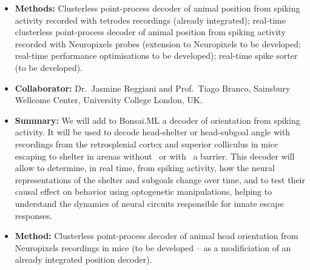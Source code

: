 \begin{itemize}
    \item\textbf{Methods:} Clusterless point-process decoder of animal position
        from spiking activity recorded with tetrodes recordings (already
        integrated); real-time clusterless point-process decoder of animal
        position from spiking activity recorded with Neuropixels probes
        (extension to Neuropixels to be developed; real-time performance
        optimisations to be developed); real-time spike sorter (to be
        developed).

\end{itemize}


\begin{itemize}

    \item\textbf{Collaborator:} Dr.~Jasmine Reggiani and Prof.~Tiago Branco,
        Sainsbury Wellcome Center, University College London, UK.

    \item\textbf{Summary:} We will add to Bonsai.ML a decoder of orientation
        from spiking activity. It will be used to decode head-shelter or
        head-subgoal angle with recordings from the retrosplenial cortex and
        superior colliculus in mice escaping to shelter in arenas
        without~\citep{campagnerEtAl23} or with~\citep{shamashEtAl21} a
        barrier.
        This decoder will allow to determine, in real time, from spiking
        activity, how the neural representations of the shelter and subgoals
        change over time, and to test their causal effect on behavior using
        optogenetic manipulations, helping to understand the dynamics of neural
        circuits responsible for innate escape responses.

    \item\textbf{Method:} Clusterless point-process decoder of animal head
        orientation from Neuropixels recordings in mice (to be developed -- as
        a modificiation of an already integrated position decoder).

\end{itemize}



